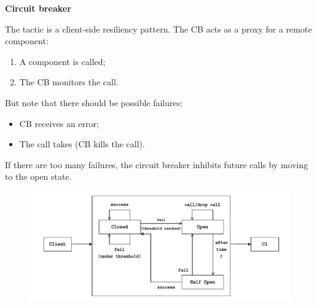 \newpage

\begin{flushleft}
    \textcolor{Red2}{ \textbf{Circuit breaker}}
\end{flushleft}
The  tactic is a client-side resiliency pattern. The CB acts as a proxy for a remote component:
\begin{enumerate}
    \item A component is called;
    \item The CB monitors the call.
\end{enumerate}
But note that there should be possible failures:
\begin{itemize}
    \item CB receives an error;
    \item The call takes  (CB kills the call).
\end{itemize}
If there are too many failures, the circuit breaker inhibits future calls by moving to the open state.

\begin{figure}[!htp]
    \centering
    \includegraphics[width=\textwidth]{img/circuit-breaker-1.pdf}
\end{figure}